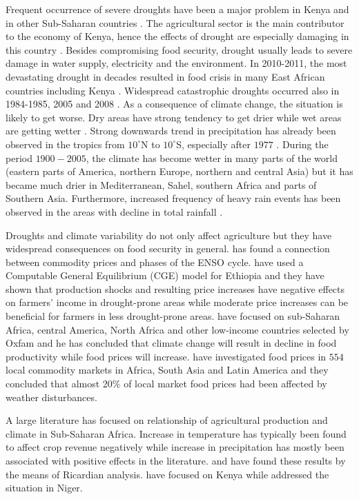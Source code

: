 \documentclass[a4paper,12pt]{article}
\begin{document}
Frequent occurrence of severe droughts have been a major problem in Kenya and in other Sub-Saharan countries \citep{Compendium, WorldBank2015, Nicholson2017}. The agricultural sector is the main contributor to the economy of Kenya, hence the effects of drought are especially damaging in this country \citep{MendelsohnDinar2000}. Besides compromising food security, drought usually leads to severe damage in water supply, electricity and the environment. In 2010-2011, the most devastating drought in decades resulted in food crisis in many East African countries including Kenya \citep{Chen2015}. Widespread catastrophic droughts occurred also in 1984-1985, 2005 and 2008 \citep{Hastenrath2007, Hastenrath2010, Hastenrath2011, Chen2015}.  As a consequence of climate change, the situation is likely to get worse. Dry areas have strong tendency to get drier while wet areas are getting wetter \citep{Trenberth2014, Chen2015, Kabubo2015}. Strong downwards trend in precipitation has already been observed in the tropics from $10^\circ$N to $10^\circ$S, especially after $1977$ \citep{IPCCtrenberth}. During the period $1900-2005$, the climate has become wetter in many parts of the world (eastern parts of America, northern Europe, northern and central Asia) but it has became much drier in Mediterranean, Sahel, southern Africa and parts of Southern Asia. Furthermore, increased frequency of heavy rain events has been observed in the areas with decline in total rainfall \citep{IPCCtrenberth}. 

Droughts and climate variability do not only affect agriculture but they have widespread consequences on food security in general. \cite{Ubilava2018} has found a connection between commodity prices and phases of the ENSO cycle. \cite{robinson2010} have used a Computable General Equilibrium (CGE) model for Ethiopia and they have shown that production shocks and resulting price increases have negative effects on farmers' income in drought-prone areas while moderate price increases can be beneficial for farmers in less drought-prone areas. \cite{OxfamIDS} have focused on sub-Saharan Africa, central America, North Africa and other low-income countries selected by Oxfam and he has concluded that climate change will result in decline in food productivity while food prices will increase. \cite{BROWN2015} have investigated food prices in $554$ local commodity markets in Africa, South Asia and Latin America and they concluded that almost 20\% of local market food prices had been affected by weather disturbances.

A large literature has focused on relationship of agricultural production and climate in Sub-Saharan Africa. Increase in temperature has typically been found to affect crop revenue negatively while increase in precipitation has mostly been associated with positive effects in the literature.  \cite{RicardianBello} and  \cite{Ochieng2016} have found these results by the means of Ricardian analysis. \cite{Ochieng2016} have focused on Kenya while \cite{RicardianBello} addressed the situation in Niger. 
\end{document}
